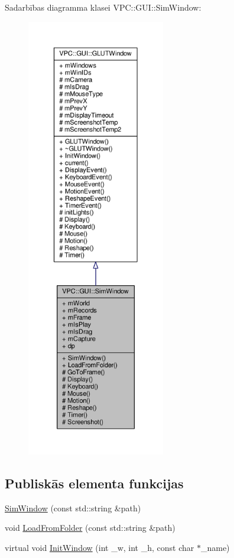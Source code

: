 Sadarbības diagramma klasei V\+PC\+:\+:G\+UI\+:\+:Sim\+Window\+:
\nopagebreak
\begin{figure}[H]
\begin{center}
\leavevmode
\includegraphics[height=550pt]{class_v_p_c_1_1_g_u_i_1_1_sim_window__coll__graph}
\end{center}
\end{figure}
\subsection*{Publiskās elementa funkcijas}
\begin{DoxyCompactItemize}
\item 
\hyperlink{class_v_p_c_1_1_g_u_i_1_1_sim_window_a992208c3ff374bcf269d7b7fcbf7324d}{Sim\+Window} (const std\+::string \&path)
\item 
void \hyperlink{class_v_p_c_1_1_g_u_i_1_1_sim_window_a4d8e529910bdb8c0afa2c675786c10e5}{Load\+From\+Folder} (const std\+::string \&path)
\item 
virtual void \hyperlink{class_v_p_c_1_1_g_u_i_1_1_g_l_u_t_window_a2e763564b7728a1b8faf65694f148d79}{Init\+Window} (int \+\_\+w, int \+\_\+h, const char $\ast$\+\_\+name)
\end{DoxyCompactItemize}
